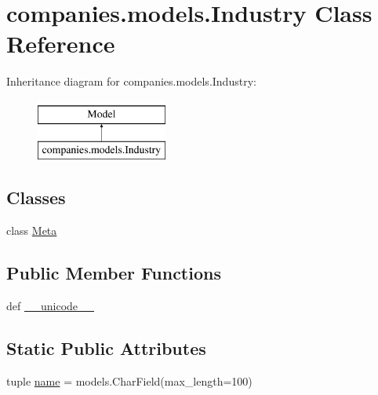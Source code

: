 \hypertarget{classcompanies_1_1models_1_1_industry}{\section{companies.\-models.\-Industry Class Reference}
\label{classcompanies_1_1models_1_1_industry}
}
Inheritance diagram for companies.\-models.\-Industry\-:\begin{figure}[H]
\begin{center}
\leavevmode
\includegraphics[height=2.000000cm]{classcompanies_1_1models_1_1_industry}
\end{center}
\end{figure}
\subsection*{Classes}
\begin{DoxyCompactItemize}
\item 
class \hyperlink{classcompanies_1_1models_1_1_industry_1_1_meta}{Meta}
\end{DoxyCompactItemize}
\subsection*{Public Member Functions}
\begin{DoxyCompactItemize}
\item 
def \hyperlink{classcompanies_1_1models_1_1_industry_af2d3aae35713a8e9f464ecff01a16775}{\-\_\-\-\_\-unicode\-\_\-\-\_\-}
\end{DoxyCompactItemize}
\subsection*{Static Public Attributes}
\begin{DoxyCompactItemize}
\item 
tuple \hyperlink{classcompanies_1_1models_1_1_industry_a4ad174e0b5863e4d8ad9e6a8f90597af}{name} = models.\-Char\-Field(max\-\_\-length=100)
\end{DoxyCompactItemize}



